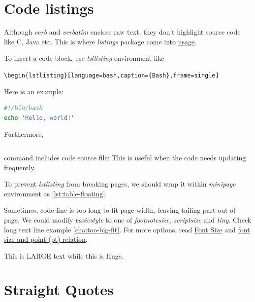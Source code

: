 \section{Code listings}
\label{sec:code-listings}

Although \textit{verb} and \textit{verbatim} enclose raw text,
they don't highlight source code like C, Java etc. This is where
\textit{listings} package come into
\href{https://en.wikibooks.org/wiki/LaTeX/Source_Code_Listings}{usage}.

To insert a code block, use \textit{lstlisting} environment like

\begin{center}
  \verb|\begin{lstlisting}[language=bash,caption={Bash},frame=single]|
\end{center}

Here is an example:

\begin{lstlisting}[language=bash,caption={Bash},frame=single]
#!/bin/bash
echo 'Hello, world!'
\end{lstlisting}

Furthermore,
\begin{lstlisting}[language=TeX,caption={Include code file},breaklines]

\end{lstlisting}
command includes code source file:
 This is useful when the code needs
updating frequently.

To prevent \textit{lstlisting} from breaking pages, we should wrap
it within \textit{minipage} environment as \ref{lst:table-floating}.

Sometimes, code line is too long to fit page width, leaving
tailing part out of page. We could modify \textit{basicstyle} to
one of \textit{footnotesize}, \textit{scriptsize} and
\textit{tiny}. Check long text line example
\ref{cha:too-big-fit}. For more options, read
\href{https://tug.org/texinfohtml/latex2e.html#Font-sizes}{Font
  Size} and \href{https://tex.stackexchange.com/q/24599}{font size
  and point (pt) relation}.

{\LARGE This is LARGE text} {\Huge while this is Huge}.

\section{Straight Quotes}
\label{sec:straight-quotes}

